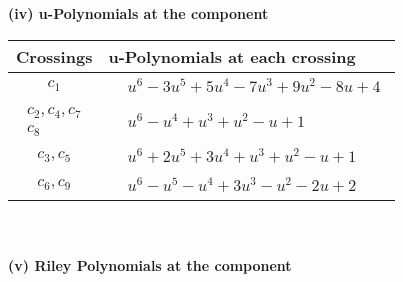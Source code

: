 \documentclass[1p]{elsarticle_modified}
\theoremstyle{definition}
\begin{document}
\newpage\renewcommand{\arraystretch}{1}
\flushleft \textbf{(iv) u-Polynomials at the component}\newline \\
\begin{tabular}{m{50pt}|m{274pt}}
Crossings & \hspace{64pt}u-Polynomials at each crossing \\
\hline $$\begin{aligned}c_{1}\end{aligned}$$&$\begin{aligned}
&u^6-3 u^5+5 u^4-7 u^3+9 u^2-8 u+4
\end{aligned}$\\
\hline $$\begin{aligned}c_{2},c_{4},c_{7}\\c_{8}\end{aligned}$$&$\begin{aligned}
&u^6- u^4+u^3+u^2- u+1
\end{aligned}$\\
\hline $$\begin{aligned}c_{3},c_{5}\end{aligned}$$&$\begin{aligned}
&u^6+2 u^5+3 u^4+u^3+u^2- u+1
\end{aligned}$\\
\hline $$\begin{aligned}c_{6},c_{9}\end{aligned}$$&$\begin{aligned}
&u^6- u^5- u^4+3 u^3- u^2-2 u+2
\end{aligned}$\\
\hline
\end{tabular}\\~\\
\newpage\renewcommand{\arraystretch}{1}
\flushleft \textbf{(v) Riley Polynomials at the component}\newline \\
\end{document}
